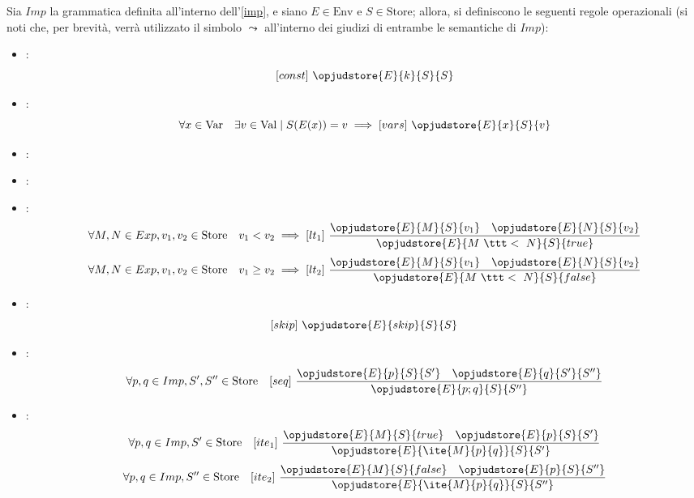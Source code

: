 \documentclass[a4paper, 12pt]{report}
\begin{document}
    \begin{example}
        \label{imp sem}
        Sia $Imp$ la grammatica definita all'interno dell'\cref{imp}, e siano $E \in \mathrm{Env}$ e $S \in \mathrm{Store}$; allora, si definiscono le seguenti regole operazionali (si noti che, per brevità, verrà utilizzato il simbolo $\leadsto$ all'interno dei giudizi di entrambe le semantiche di $Imp$):

        \begin{itemize}
            \item {}: $$[const] \ \opjudstore{E}{k}{S}{S}$$
            \item {}: $$\forall x \in \mathrm{Var} \quad \exists v \in \mathrm{Val} \mid S(E(x)) = v \implies [vars] \ \opjudstore{E}{x}{S}{v}$$
            \item {}: 
            \item {}: 
            \item {}: $$\forall M, N \in Exp, v_1, v_2 \in \mathrm{Store} \quad v_1 < v_2 \implies [lt_1] \ \dfrac{\opjudstore{E}{M}{S}{v_1} \quad \opjudstore{E}{N}{S}{v_2}}{\opjudstore{E}{M \ \ttt < \ N}{S}{true}}$$ $$\forall M, N \in Exp, v_1, v_2 \in \mathrm{Store} \quad v_1 \ge v_2 \implies [lt_2] \ \dfrac{\opjudstore{E}{M}{S}{v_1} \quad \opjudstore{E}{N}{S}{v_2}}{\opjudstore{E}{M \ \ttt < \ N}{S}{false}}$$
            \item {}: $$[skip] \ \opjudstore{E}{skip}{S}{S}$$
            \item {}: $$\forall p, q \in Imp, S', S'' \in \mathrm{Store} \quad [seq] \ \dfrac{\opjudstore{E}{p}{ S}{S'} \quad \opjudstore{E}{q}{ S'}{S''}}{\opjudstore{E}{p;q}{S}{S''}}$$
            \item {}: $$\forall p, q \in Imp, S' \in \mathrm{Store} \quad [ite_1] \ \dfrac{\opjudstore{E}{M}{ S}{true} \quad \opjudstore{E}{p}{S}{S'}}{\opjudstore{E}{\ite{M}{p}{q}}{S}{S'}}$$ $$\forall p, q \in Imp, S'' \in \mathrm{Store} \quad [ite_2] \ \dfrac{\opjudstore{E}{M}{S}{false} \quad \opjudstore{E}{p}{S}{S''}}{\opjudstore{E}{\ite{M}{p}{q}}{S}{S''}}$$

\end{itemize}
\end{example}
\end{document}
